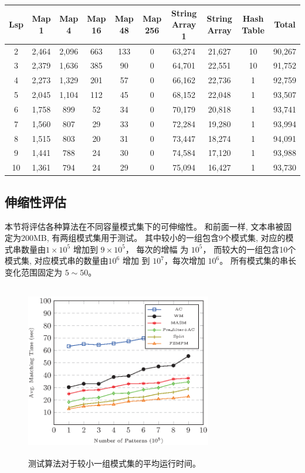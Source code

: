 \begin{table}[!h]
  \centering
  \footnotesize
  \label{tab:node types}
  \begin{tabular}{cccccccccc}
 \hline
 Lsp &
 Map 1 &
 Map 4 &
 Map 16 &
 Map 48 &
 Map 256 &
 String Array 1&
 String Array   &
 Hash Table &
 Total\\
 \hline
 2  & 2,464 & 2,096 & 663 & 133 & 0 & 63,274 &  21,627 & 10 & 90,267\\
 3  & 2,379 & 1,636 & 385 & 90  & 0 & 64,701 &  22,551 & 10 & 91,752\\
 4  & 2,273 & 1,329 & 201 & 57  & 0 & 66,162 &  22,736 &  1 & 92,759\\
 5  & 2,045 & 1,104 & 112 & 45  & 0 & 68,152 &  22,048 &  1 & 93,507\\
 6  & 1,758 &   899 &  52 & 34  & 0 & 70,179 &  20,818 &  1 & 93,741\\
 7  & 1,560 &   807 &  29 & 33  & 0 & 72,284 &  19,280 &  1 & 93,994\\
 8  & 1,515 &   803 &  20 & 31  & 0 & 73,447 &  18,274 &  1 & 94,091\\
 9  & 1,441 &   788 &  24 & 30  & 0 & 74,584 &  17,120 &  1 & 93,988\\
10  & 1,361 &   794 &  24 & 29  & 0 & 75,094 &  16,427 &  1 & 93,730\\
\hline
  \end{tabular}
\end{table}

\subsection{伸缩性评估}

本节将评估各种算法在不同容量模式集下的可伸缩性。 和前面一样, 文本串被固
定为200MB, 有两组模式集用于测试。 其中较小的一组包含9个模式集, 对应的模
式串数量由$1 \times 10^5$ 增加到 $9 \times 10^5$， 每次的增幅
为 $10^5$， 而较大的一组包含10个模式集, 对应模式串的数量由$10^6$ 增加
到 $10^7$，每次增加 $10^6$。 所有模式集的串长变化范围固定为 $5 \sim
50$。


\begin{figure}[H]
  \centering
  \includegraphics[height=3in, width=3.2in]{figures/2_MPM/small_group}
  \caption{测试算法对于较小一组模式集的平均运行时间。}
  \label{fig:small_group}
\end{figure}

